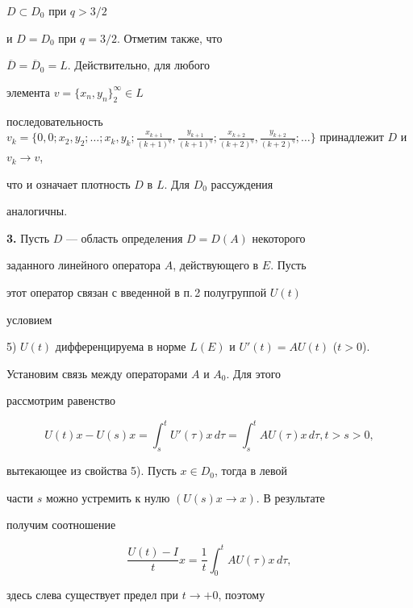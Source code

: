 $D\subset D_{0}$ при $q > 3/2$


и $D=D_{0}$ при $q=3/2$. Отметим также, что


$\overline{D}=\overline{D}_{0}=L$. Действительно, для любого


элемента $v=\{x_{n}, y_{n}\}^{\infty}_{2} \in L$


последовательность $v_{k}=\{0,0; x_{2}, y_{2}; \dotsc; x_{k}, y_{k};


\frac{x_{k+1}}{(k+1)^{q}},\frac{y_{k+1}}{(k+1)^{q}};


\frac{x_{k+2}}{(k+2)^{q}},


\frac{y_{k+2}}{(k+2)^{q}}; \dotsc \}$ принадлежит $D$ и $v_{k} \to v$,


что и означает плотность $D$ в $L$. Для $D_{0}$ рассуждения


аналогичны.


\medskip





{\bf 3.} Пусть $D$ --- область определения $D=D(A)$ некоторого


заданного линейного оператора $A$, действующего в $E$. Пусть


этот оператор связан с введенной в п.\,2 полугруппой $U(t)$


условием





5) $U(t)$ дифференцируема в норме $L(E)$ и $U'(t)=AU(t)$ ($t> 0$).





Установим связь между операторами $A$ и $A_{0}$. Для этого


рассмотрим равенство


$$


U(t)x-U(s)x=\int^{t}_{s}U'(\tau)x\,d\tau=


\int^{t}_{s}A U(\tau)x\,d\tau,  t>s>0,


$$


вытекающее из свойства 5). Пусть $x\in D_{0}$, тогда в левой


части $s$ можно устремить к нулю $(U(s)x\to x)$. В результате


получим соотношение


$$


\frac{U(t)-I}{t}x=\frac{1}{t}\int^{t}_{0}AU(\tau) x\,d\tau,


$$


здесь слева существует предел при $t\to +0$, поэтому


